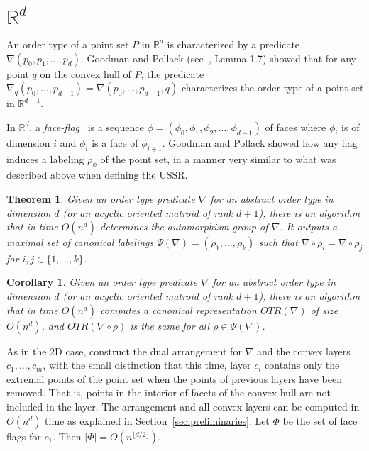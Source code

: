 \documentclass[leqno,12pt]{article}
\def\R{\mathbb{R}}
\newtheorem{theorem}{Theorem}
\newtheorem{corollary}{Corollary}
\begin{document}
\section{$\R^d$}

An order type of a point set $P$ in $\R^d$ is characterized by a predicate
$\nabla(p_0,p_1,\ldots,p_d)$. Goodman and Pollack (see~\cite{goodman_pollack_83_sorting}, Lemma 1.7) showed that for any point $q$ on the convex hull of
$P$, the predicate 
$\nabla_q(p_0,\ldots,p_{d-1}) = \nabla(p_0,\ldots,p_{d-1},q)$
characterizes the order type of a point set in $\R^{d-1}$.

In $\R^d$, a \emph{face-flag}~\cite{goodman_pollack_83_sorting} is a sequence 
$\phi = (\phi_0,\phi_1,\phi_2,\ldots,\phi_{d-1})$ 
of faces where $\phi_i$ is of dimension $i$ and $\phi_i$ is a face of
$\phi_{i+1}$. Goodman and Pollack showed how any flag induces a
labeling $\rho_\phi$ of the point set, in a manner
very similar to what was described above when defining the USSR.
\begin{theorem}
\label{theo:Rd}
Given an order type predicate $\nabla$ for an abstract order type in
dimension $d$ (or an acyclic oriented matroid of rank $d{+}1$), there
is an algorithm that in time $O(n^d)$ determines the automorphism
group of $\nabla$. 
It outputs a maximal set of canonical labelings $\Psi(\nabla) =
(\rho_1,\ldots,\rho_k)$ such that 
$\nabla\circ\rho_i=\nabla\circ\rho_j$ for $i,j\in\{1,\ldots,k\}$. 
\end{theorem}

\begin{corollary}
Given an order type predicate $\nabla$ for an abstract order type in
dimension $d$ (or an acyclic oriented matroid of rank $d{+}1$), there
is an algorithm that in time $O(n^d)$ computes a canonical
representation $OTR(\nabla)$ of size $O(n^d)$, and
$OTR(\nabla\circ\rho)$ is the same for all $\rho\in\Psi(\nabla)$.
\end{corollary}

As in the 2D case, construct the dual arrangement for $\nabla$ and the
convex layers $c_1,\ldots,c_m$, with
the small distinction that this time, layer $c_i$ contains only the
extremal points of the point set when the points of previous layers
have been removed. That is, points in the interior of facets of the
convex hull are not included in the layer. 
The arrangement and all convex layers can be computed in $O(n^d)$ time
as explained in Section~\ref{sec:preliminaries}.
Let $\Phi$ be the set of face flags for $c_1$. Then $|\Phi| = O(n^{\lfloor d/2\rfloor})$.
\end{document}
